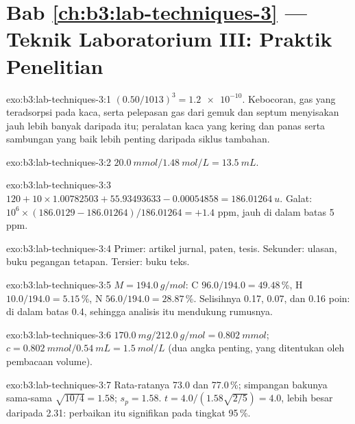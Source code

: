 \section*{Bab \ref{ch:b3:lab-techniques-3} --- Teknik Laboratorium III: Praktik Penelitian}

\begin{solution}{exo:b3:lab-techniques-3:1}
$(0.50/1013)^3 = \num{1.2e-10}$. Kebocoran, gas yang teradsorpsi pada kaca, serta pelepasan gas dari gemuk dan septum
menyisakan jauh lebih banyak daripada itu; peralatan kaca yang kering dan panas serta sambungan yang baik lebih penting daripada
siklus tambahan.
\end{solution}

\begin{solution}{exo:b3:lab-techniques-3:2}
$\qty{20.0}{mmol}/\qty{1.48}{mol/L} = \qty{13.5}{mL}$.
\end{solution}

\begin{solution}{exo:b3:lab-techniques-3:3}
$120 + 10 \times 1.00782503 + 55.93493633 - 0.00054858 = \qty{186.01264}{u}$. Galat: $10^6 \times (186.0129 - 186.01264)/186.01264 = +1.4$ ppm,
jauh di dalam batas 5 ppm.
\end{solution}

\begin{solution}{exo:b3:lab-techniques-3:4}
Primer: artikel jurnal, paten, tesis. Sekunder: ulasan,
buku pegangan tetapan. Tersier: buku teks.
\end{solution}

\begin{solution}{exo:b3:lab-techniques-3:5}
$M = \qty{194.0}{g/mol}$: C $96.0/194.0 = 49.48$\,\%, H $10.0/194.0 = 5.15$\,\%, N $56.0/194.0 = 28.87$\,\%. Selisihnya 0.17, 0.07, dan 0.16
poin: di dalam batas 0.4, sehingga analisis itu mendukung rumusnya.
\end{solution}

\begin{solution}{exo:b3:lab-techniques-3:6}
$\qty{170.0}{mg}/\qty{212.0}{g/mol} = \qty{0.802}{mmol}$; $c = \qty{0.802}{mmol}/\qty{0.54}{mL} = \qty{1.5}{mol/L}$ (dua angka penting, yang ditentukan oleh
pembacaan volume).
\end{solution}

\begin{solution}{exo:b3:lab-techniques-3:7}
Rata-ratanya 73.0 dan 77.0\,\%; simpangan bakunya sama-sama $\sqrt{10/4} = 1.58$; $s_p = 1.58$. $t = 4.0/(1.58\sqrt{2/5}) = 4.0$, lebih besar daripada
2.31: perbaikan itu signifikan pada tingkat 95\,\%.
\end{solution}

